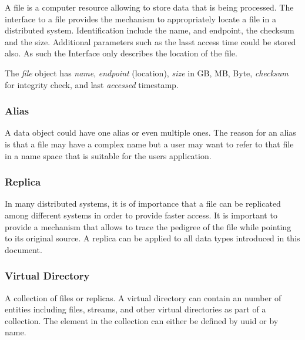 \documentclass[10pt]{article}
\begin{document}
A file is a computer resource allowing to store data that is being
processed. The interface to a file provides the mechanism to
appropriately locate a file in a distributed system. Identification
include the name, and endpoint, the checksum and the size. Additional
parameters such as the lasst access time could be stored also. As such
the Interface only describes the location of the file.

The \textit{file} object has \textit{name}, \textit{endpoint}
(location), \textit{size} in GB, MB, Byte, \textit{checksum} for
integrity check, and last \textit{accessed} timestamp.


\subsubsection{Alias}

A data object could have one alias or even multiple ones. The reason for an
alias is that a file may have a complex name but a user may want to
refer to that file in a name space that is suitable for the users
application.


\subsubsection{Replica}

In many distributed systems, it is of importance that a file can be
replicated among different systems in order to provide faster access.
It is important to provide a mechanism that allows to trace the
pedigree of the file while pointing to its original source. A replica
can be applied to all data types introduced in this document.



\subsubsection{Virtual Directory}

A collection of files or replicas. A virtual directory can contain an
number of entities including files, streams, and other virtual
directories as part of a collection. The element in the collection can
either be defined by uuid or by name. 

\end{document}
